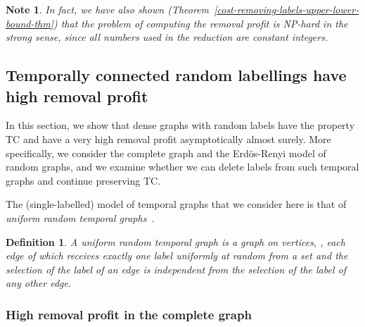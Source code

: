 \documentclass[a4paper,UKenglish]{article}
\newtheorem{definition}{Definition}
\newtheorem*{note*}{Note}
\begin{document}
\begin{note*}
In fact, we have also shown (Theorem~\ref{cost-removing-labels-upper-lower-bound-thm}) that the problem of computing the removal profit is NP-hard in the strong sense, since all numbers used in the reduction are constant integers.
\end{note*}





\subsection{Temporally connected random labellings have high removal profit}\label{sec:random_labels_minimal}

In this section, we show that dense graphs with random labels have the property TC and have a very high removal profit asymptotically almost surely.
More specifically, we consider the complete graph and the Erd\"os-Renyi model of random graphs,  and we examine whether we can delete labels from such temporal graphs and continue preserving TC.

The (single-labelled) model of temporal graphs that we consider here is that of \emph{uniform random temporal graphs}~\cite{akrida-jpdc}.
\begin{definition}\label{def:random}\hspace{-0,01cm}\protect\cite{akrida-jpdc}
A \emph{uniform random temporal graph} is a graph  on  vertices, , each edge of which receives exactly one label uniformly at random from a set  and the selection of the label of an edge is independent from the selection of the label of any other edge.
\end{definition}


\subsubsection{High removal profit in the complete graph}
\end{document}

